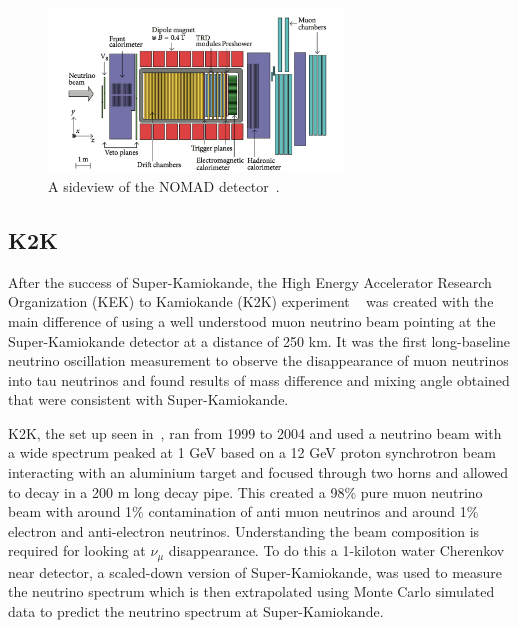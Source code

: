\begin{figure}[h!]
\centering
  \centering
\includegraphics[width=0.7\textwidth]{figures/NOMAD2.jpeg}
\vspace{2mm}
\caption{A sideview of the NOMAD detector~\cite{69NOMAD}.}
\label{fig:NOMAD}
\end{figure}

\subsection{K2K}
After the success of Super-Kamiokande, the High Energy Accelerator Research Organization (KEK) to Kamiokande (K2K) experiment ~\cite{22K2K} was created with the main difference of using a well understood muon neutrino beam pointing at the Super-Kamiokande detector at a distance of 250 km. It was the first long-baseline neutrino oscillation measurement to observe the disappearance of muon neutrinos into tau neutrinos and found results of mass difference and mixing angle obtained that were consistent with Super-Kamiokande.

K2K, the set up seen in~, ran from 1999 to 2004 and used a neutrino beam with a wide spectrum peaked at 1 GeV based on a 12 GeV proton synchrotron beam interacting with an aluminium target and focused through two horns and allowed to decay in a 200 m long decay pipe. This created a 98\% pure muon neutrino beam with around 1\% contamination of anti muon neutrinos and around 1\% electron and anti-electron neutrinos. Understanding the beam composition is required for looking at $\nu_\mu$ disappearance. To do this a 1-kiloton water Cherenkov near detector,  a scaled-down version of Super-Kamiokande, was used to measure the neutrino spectrum which is then extrapolated using Monte Carlo simulated data to predict the neutrino spectrum at Super-Kamiokande.

